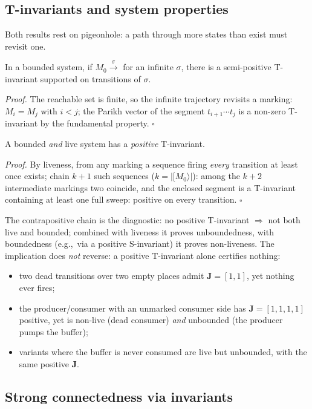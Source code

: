 \subsection{T-invariants and system properties}

Both results rest on pigeonhole: a path through more states than exist must revisit one.

\begin{lemma}[Reproduction]
In a bounded system, if $M_0 \xrightarrow{\sigma}$ for an infinite $\sigma$, there is a semi-positive T-invariant supported on transitions of $\sigma$.
\end{lemma}
\textit{Proof.} The reachable set is finite, so the infinite trajectory revisits a marking: $M_i = M_j$ with $i < j$; the Parikh vector of the segment $t_{i+1} \cdots t_j$ is a non-zero T-invariant by the fundamental property. \hfill$\square$

\begin{theorem}
A bounded \emph{and} live system has a \emph{positive} T-invariant.
\end{theorem}
\textit{Proof.} By liveness, from any marking a sequence firing \emph{every} transition at least once exists; chain $k + 1$ such sequences ($k = |[M_0\rangle|$): among the $k + 2$ intermediate markings two coincide, and the enclosed segment is a T-invariant containing at least one full sweep: positive on every transition. \hfill$\square$

The contrapositive chain is the diagnostic: no positive T-invariant $\Rightarrow$ not both live and bounded; combined with liveness it proves unboundedness, with boundedness (e.g.,\ via a positive S-invariant) it proves non-liveness. The implication does \emph{not} reverse: a positive T-invariant alone certifies nothing:
\begin{itemize}
  \item two dead transitions over two empty places admit $\mathbf{J} = [1,1]$, yet nothing ever fires;
  \item the producer/consumer with an unmarked consumer side has $\mathbf{J} = [1,1,1,1]$ positive, yet is non-live (dead consumer) \emph{and} unbounded (the producer pumps the buffer);
  \item variants where the buffer is never consumed are live but unbounded, with the same positive $\mathbf{J}$.
\end{itemize}

\subsection{Strong connectedness via invariants}

